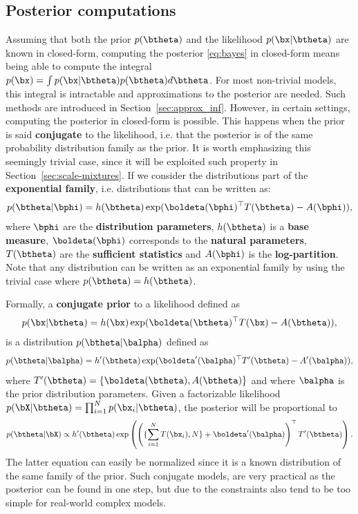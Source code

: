 \subsection{Posterior computations}
\label{sec:posterior}
Assuming that both the prior $p(\btheta)$ and the likelihood $p(\bx|\btheta)$ are known in closed-form, computing the posterior \eqref{eq:bayes} in closed-form means being able to compute the integral $p(\bx)=\int p(\bx|\btheta)p(\btheta)d\btheta$.
For most non-trivial models, this integral is intractable and approximations to the posterior are needed.
Such methods are introduced in Section~\ref{sec:approx_inf}.
However, in certain settings, computing the posterior in closed-form is possible.
This happens when the prior is said \textbf{conjugate} to the likelihood, i.e. that the posterior is of the same probability distribution family as the prior.
It is worth emphasizing this seemingly trivial case, since it will be exploited such property in Section~\ref{sec:scale-mixtures}.
If we consider the distributions part of the \textbf{exponential family}, i.e. distributions that can be written as:
\begin{align}
    p(\btheta|\bphi) = h(\btheta)\exp(\boldeta(\bphi)^\top T(\btheta) - A(\bphi)),
    \label{eq:expfamily}
\end{align}
where $\bphi$ are the \textbf{distribution parameters}, $h(\btheta)$ is a \textbf{base measure}, $\boldeta(\bphi)$ corresponds to the \textbf{natural parameters}, $T(\btheta)$ are the \textbf{sufficient statistics} and $A(\bphi)$ is the \textbf{log-partition}.
Note that any distribution can be written as an exponential family by using the trivial case where $p(\btheta)=h(\btheta)$.

Formally, a \textbf{conjugate prior} to a likelihood defined as
\begin{align}
    p(\bx|\btheta) = h(\bx)\exp(\boldeta(\btheta)^\top T(\bx) - A(\btheta)),
    \label{eq:explikelihood}
\end{align}
is a distribution $p(\btheta|\balpha)$ defined as
\begin{align}
    p(\btheta|\balpha) = h'(\btheta)\exp(\boldeta'(\balpha)^\top T'(\btheta) - A'(\balpha)),
    \label{eq:expprior}
\end{align}
where $T'(\btheta) = \left\{\boldeta(\btheta), A(\btheta)\right\}$ and where $\balpha$ is the prior distribution parameters.
Given a factorizable likelihood $p(\bX|\btheta) = \prod_{i=1}^N p(\bx_i|\btheta)$, the posterior will be proportional to
\begin{align*}
    p(\btheta|\bX) \propto h'(\btheta)\exp\left(\left(\{\sum_{i=1}^N T(\bx_i), N\} + \boldeta'(\balpha)\right)^\top T'(\btheta)\right).
\end{align*}
The latter equation can easily be normalized since it is a known distribution of the same family of the prior.
Such conjugate models, are very practical as the posterior can be found in one step, but due to the constraints also tend to be too simple for real-world complex models.


